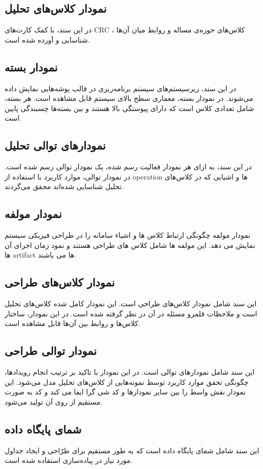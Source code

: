 \subsection{نمودار کلاس‌های تحلیل}
در این سند، با کمک  کارت‌های CRC ، کلاس‌های حوزه‌ی مساله و روابط میان آن‌ها شناسایی و آورده شده است.


\subsection{نمودار بسته}
در این سند، زیرسیستم‌های سیستم برنامه‌ریزی در قالب پوشه‌هایی نمایش داده می‌شوند. در نمودار بسته، معماری سطح بالای سیستم قابل مشاهده است. هر بسته، شامل تعدادی کلاس است که دارای پیوستگی
بالا هستند و بین بسته‌ها چسبندگی
پایین است.

\subsection{نمودارهای توالی تحلیل}
در این سند، به ازای هر نمودار فعالیت رسم شده، یک نمودار توالی رسم شده است. در نمودار توالی، موارد کاربرد با استفاده از operation ها و اشیایی که در کلاس‌های تحلیل شناسایی شده‌اند محقق می‌گردند.

\subsection{ نمودار مولفه}
نمودار مولفه چگونگی ارتباط کلاس ها و اشیاء سامانه را در طراحی فیزیکی سیستم نمایش می دهد. این مولفه ها شامل کلاس های طراحی هستند و نمود زمان اجرای آن ها artifact ها می باشند.
\subsection{نمودار کلاس‌های طراحی}
این سند شامل نمودار کلاس‌های طراحی است. این نمودار کامل شده کلاس‌های تحلیل است و ملاحظات قلمرو مسئله در آن در نظر گرفته شده است. در این نمودار، ساختار کلاس‌ها  و روابط بین آن‌ها قابل مشاهده است.
\subsection{نمودار توالی طراحی}
این سند شامل نمودارهای توالی است. در این نمودار با تاکید بر ترتیب انجام رویدادها، چگونگی تحقق موارد کاربرد  توسط نمونه‌هایی از کلاس‌های تحلیل مدل می‌شود. این نمودار نقش واسط را بین سایر نمودارها و کد شی گرا ایفا می کند و کد به صورت مستقیم از روی آن تولید می‌شود.

\subsection{شمای پایگاه داده}
این سند شامل شمای پایگاه داده است که به طور مستقیم برای طرّاحی و ایجاد جداول مورد نیاز در پیاده‌سازی استفاده شده است.

